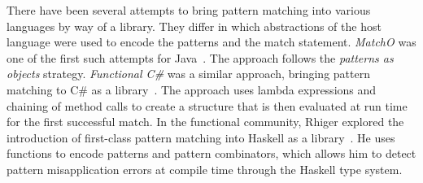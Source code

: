 There have been several attempts to bring pattern matching into various 
languages by way of a library. They differ in which abstractions of the host 
language were used to encode the patterns and the match statement. \emph{MatchO} was one of the first 
such attempts for Java~\cite{Visser06matchingobjects}. The approach follows the
\emph{patterns as objects} strategy.
%
\emph{Functional C\#} was a similar approach, bringing pattern matching to 
C\# as a library~\cite{FuncCSharp}. The approach uses lambda expressions and 
chaining of method calls to create a structure that is then evaluated at 
run time for the first successful match. %
%
In the functional community, Rhiger explored the introduction of first-class pattern 
matching into Haskell as a library~\cite{Rhiger09}. He uses functions to encode 
patterns and pattern combinators, which allows him to detect pattern 
misapplication errors at compile time through the Haskell type system. 
